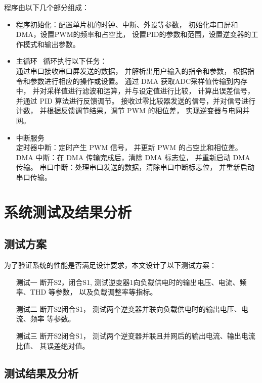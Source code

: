 \documentclass[a4paper,12pt]{article}
\begin{document}
程序由以下几个部分组成：
\begin{itemize}
    \item 程序初始化：配置单片机的时钟、中断、外设等参数，
    初始化串口屏和DMA，设置PWM的频率和占空比，
    设置PID的参数和范围，设置逆变器的工作模式和输出参数。
    \item 主循环 \ 循环执行以下任务：
    \\
    通过串口接收串口屏发送的数据，
    并解析出用户输入的指令和参数，
    根据指令和参数进行相应的操作或设置。
    通过 DMA 获取ADC采样值传输到内存中，
    并对采样值进行滤波和运算，并与设定值进行比较，
    计算出误差信号，并通过 PID 算法进行反馈调节。
    接收过零比较器发送的信号，并对信号进行计数，
    并根据反馈调节结果，调节 PWM 的相位差，
    实现逆变器与电网并网。
    \item 中断服务 
    \\
    定时器中断：定时产生 PWM 信号，
    并更新 PWM 的占空比和相位差。
    DMA 中断：在 DMA 传输完成后，清除 DMA 标志位，
    并重新启动 DMA 传输。
    串口中断：处理串口发送的数据，清除串口中断标志位，
    并重新启动串口传输。
\end{itemize}

\newpage

\section{系统测试及结果分析}

\subsection{测试方案}
为了验证系统的性能是否满足设计要求，本文设计了以下测试方案：
\begin{itemize}
    \item[测试一] 断开S2，闭合S1,
    测试逆变器1向负载供电时的输出电压、电流、频率、THD 等参数，
    以及负载调整率等指标。
    \item[测试二] 断开S2闭合S1，
    测试两个逆变器并联向负载供电时的输出电压、电流、频率 等参数。
    \item[测试三] 断开S2闭合S1，
    测试两个逆变器并联且并网后的输出电流、输出电流比值、
    其误差绝对值。
\end{itemize}

\subsection{测试结果及分析}

\newpage
\end{document}

